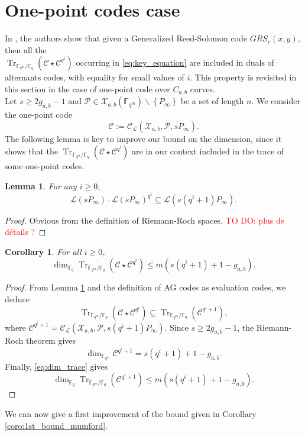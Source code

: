 \documentclass[a4paper]{article}
\newtheorem{coro}[thm]{Corollary}
\newtheorem{lemma}[thm]{Lemma}
\theoremstyle{definition}
\theoremstyle{remark}
\newcommand{\calP}{\mathcal{P}}
\newcommand{\calL}{\mathcal{L}}
\newcommand{\calC}{\mathcal{C}}
\newcommand{\calX}{\mathcal{X}}
\newcommand{\fqm}{\mathbb{F}_{q^m}}
\newcommand{\fq}{\mathbb{F}_{q}}
\newcommand{\Tr}[1]{\operatorname{Tr}_{\mathbb{F}_{q^m}/\fq}\left(#1\right)}
\newcommand{\set}[1]{\left\{#1\right\}}
\newcommand\TODO[1]{\textcolor{red}{TO DO: #1}}
\begin{document}
\section{One-point codes case}

In \cite{MT21}, the authors show that given a Generalized Reed-Solomon code $GRS_r(x,y)$, then all the \\ $\Tr{\calC\star \calC^{q^i}}$ occurring in \eqref{eq:key_equation} are included in duals of alternants codes, with equality for small values of $i$. This property is revisited in this section in the case of one-point code over $C_{a,b}$ curves. \\

\noindent Let $s \geq 2g_{a,b} -1$ and $\calP \in \calX_{a,b}(\fqm) \backslash \set{P_\infty}$ be a set of length $n$. We consider the one-point code
$$\calC := \calC_{\calL}(\calX_{a,b},\calP,sP_{\infty}).$$
The following lemma is key to improve our bound on the dimension, since it shows that the $\Tr{\calC\star \calC^{q^i}}$ are in our context included in the trace of some one-point codes.

\begin{lemma} \label{lem:inclusion_espaces_RR}
 For any $i \geq 0$,
  $$\calL(sP_\infty) \cdot \calL(sP_\infty)^{q^i} \subseteq \calL(s(q^i+1)P_\infty).$$
\end{lemma}

\begin{proof}
Obvious from the definition of Riemann-Roch spaces. \TODO{plus de détails ?}
\end{proof}

\begin{coro} \label{coro:bound_dim_Tr(C*C^q^i)}
    For all $i \geq 0$, 
    $$\dim_{\fq} \Tr{\calC\star \calC^{q^i}} \leq m\left(s\left(q^i+1\right)+1-g_{a,b}\right).$$
\end{coro}

\begin{proof}
    From Lemma \ref{lem:inclusion_espaces_RR} and the definition of AG codes as evaluation codes, we deduce 
    $$\Tr{\calC\star \calC^{q^i}} \subseteq \Tr{\calC^{q^i+1}},$$
    where $\calC^{q^i+1} = \calC_{\calL}(\calX_{a,b},\calP,s(q^i+1)P_\infty).$ Since $s\geq 2g_{a,b}-1$, the Riemann-Roch theorem gives 
    $$\dim_{\fqm} \calC^{q^i+1} = s(q^i+1)+1-g_{a,b}.$$
    Finally, \eqref{eq:dim_trace} gives 
    $$\dim_{\fq} \Tr{\calC^{q^i+1}} \leq m(s(q^i+1)+1-g_{a,b}).$$
\end{proof}

We can now give a first improvement of the bound given in Corollary \ref{coro:1st_bound_mumford}.
\end{document}
